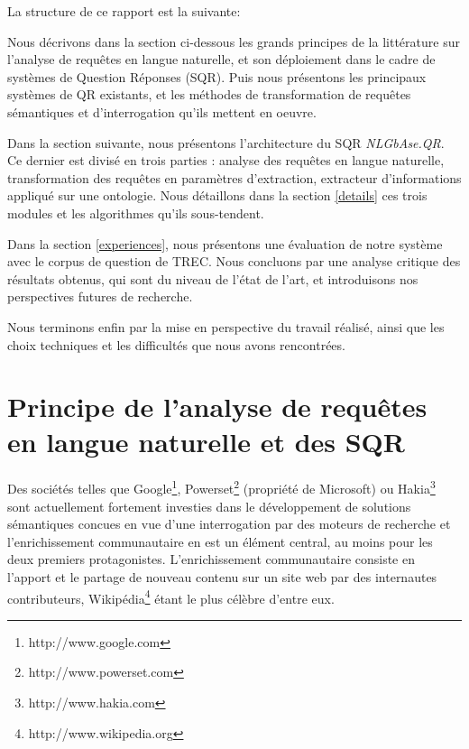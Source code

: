 \documentclass[10pt,a4paper]{article}
\begin{document}
\par La structure de ce rapport est la suivante: 

\par Nous décrivons dans la section ci-dessous les grands principes de la littérature sur l'analyse de requêtes en langue naturelle, et son déploiement dans le cadre de systèmes de Question Réponses (SQR). Puis nous présentons les principaux systèmes de QR existants, et les méthodes de transformation de requêtes sémantiques et d'interrogation qu'ils mettent en oeuvre. 
\par Dans la section suivante, nous présentons l'architecture du SQR \textit{NLGbAse.QR}. Ce dernier est divisé en trois parties : analyse des requêtes en langue naturelle, transformation des requêtes en paramètres d'extraction, extracteur d'informations appliqué sur une ontologie. Nous détaillons dans la section \ref{details} ces trois modules et les algorithmes qu'ils sous-tendent. 
\par Dans la section \ref{experiences}, nous présentons une évaluation de notre système avec le corpus de question de TREC. Nous concluons par une analyse critique des résultats obtenus, qui sont du niveau de l'état de l'art, et introduisons nos perspectives futures de recherche. 
\par Nous terminons enfin par la mise en perspective du travail réalisé, ainsi que les choix techniques et les difficultés que nous avons rencontrées.

\section{Principe de l'analyse de requêtes en langue naturelle et des SQR}
\par Des sociétés telles que Google\footnote{http://www.google.com}, Powerset\footnote{http://www.powerset.com} (propriété de Microsoft) ou Hakia\footnote{http://www.hakia.com} sont actuellement fortement investies dans le développement de solutions sémantiques concues en vue  d'une interrogation par des moteurs de recherche et l'enrichissement communautaire en est un élément central, au moins pour les deux premiers protagonistes. L'enrichissement communautaire consiste en l'apport et le partage de nouveau contenu sur un site web par des internautes contributeurs, Wikipédia\footnote{http://www.wikipedia.org} étant le plus célèbre d'entre eux.
\end{document}
